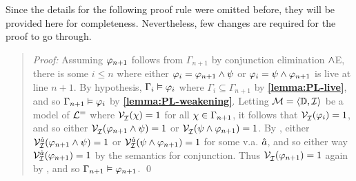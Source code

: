 
Since the details for the following proof rule were omitted before, they will be provided here for completeness.
Nevertheless, few changes are required for the proof to go through.


\begin{quote} 
  \textit{Proof:} Assuming $\varphi_{n+1}$ follows from $\Gamma_{n+1}$ by conjunction elimination $\wedge$E, there is some $i\leq n$ where either $\varphi_i=\varphi_{n+1}\wedge\psi$ or $\varphi_i=\psi\wedge\varphi_{n+1}$ is live at line $n+1$.
  By hypothesis, $\Gamma_i\vDash \varphi_i$ where $\Gamma_i\subseteq \Gamma_{n+1}$ by \textbf{\ref{lemma:PL-live}}, and so $\Gamma_{n+1} \vDash \varphi_i$ by \textbf{\ref{lemma:PL-weakening}}.
  Letting $\mathcal{M}=\langle\mathbb{D},\mathcal{I}\rangle$ be a model of $\mathcal{L}^{=}$ where $\mathcal{V}_{\mathcal{I}}^{}(\chi) = 1$ for all $\chi \in \Gamma_{n+1}$, it follows that $\mathcal{V}_{\mathcal{I}}^{}(\varphi_i) = 1$, and so either $\mathcal{V}_{\mathcal{I}}^{}(\varphi_{n+1}\wedge\psi) = 1$ or $\mathcal{V}_{\mathcal{I}}^{}(\psi\wedge\varphi_{n+1}) = 1$.
  By , either $\mathcal{V}_{\mathcal{I}}^{\hat{a}}(\varphi_{n+1}\wedge\psi)=1$ or $\mathcal{V}_{\mathcal{I}}^{\hat{a}}(\psi\wedge\varphi_{n+1})=1$ for some v.a. $\hat{a}$, and so either way $\mathcal{V}_{\mathcal{I}}^{\hat{a}}(\varphi_{n+1})=1$ by the semantics for conjunction.
  Thus $\mathcal{V}_{\mathcal{I}}^{}(\varphi_{n+1}) = 1$ again by , and so $\Gamma_{n+1} \vDash \varphi_{n+1}$.
  \qed
\end{quote}






